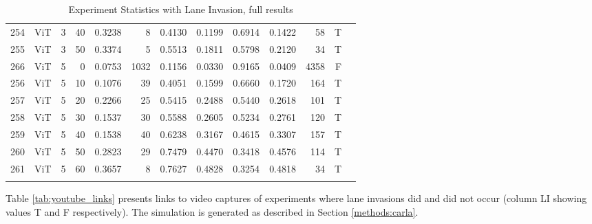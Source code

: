 \begin{longtable}{@{}cllrrrrrrrrrc@{}}
254 & ViT & 3 & 40 & 0.3238 & 8 & 0.4130 & 0.1199 & 0.6914 & 0.1422 & 58 & T \\
255 & ViT & 3 & 50 & 0.3374 & 5 & 0.5513 & 0.1811 & 0.5798 & 0.2120 & 34 & T \\
266 & ViT & 5 & 0 & 0.0753 & 1032 & 0.1156 & 0.0330 & 0.9165 & 0.0409 & 4358 & F \\
256 & ViT & 5 & 10 & 0.1076 & 39 & 0.4051 & 0.1599 & 0.6660 & 0.1720 & 164 & T \\
257 & ViT & 5 & 20 & 0.2266 & 25 & 0.5415 & 0.2488 & 0.5440 & 0.2618 & 101 & T \\
258 & ViT & 5 & 30 & 0.1537 & 30 & 0.5588 & 0.2605 & 0.5234 & 0.2761 & 120 & T \\
259 & ViT & 5 & 40 & 0.1538 & 40 & 0.6238 & 0.3167 & 0.4615 & 0.3307 & 157 & T \\
260 & ViT & 5 & 50 & 0.2823 & 29 & 0.7479 & 0.4470 & 0.3418 & 0.4576 & 114 & T \\
261 & ViT & 5 & 60 & 0.3657 & 8 & 0.7627 & 0.4828 & 0.3254 & 0.4818 & 34 & T \\
\bottomrule
\caption{Experiment Statistics with Lane Invasion, full results}
\label{tab:experiment_stats}
\end{longtable}

Table \ref{tab:youtube_links} presents links to video captures of experiments where lane invasions did and did not occur (column LI showing values T and F respectively). The simulation is generated as described in Section \ref{methods:carla}.

